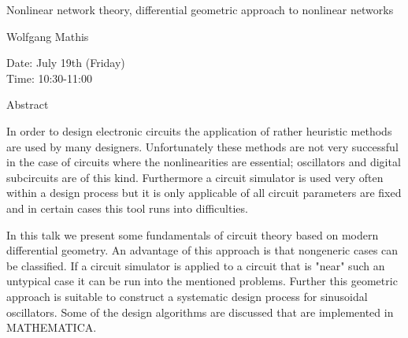 \begin{center}
\LARGE
Nonlinear network theory, differential geometric approach
                     to nonlinear networks
\end{center}

\begin{center}
\Large
Wolfgang Mathis

\end{center}

\noindent
Date:  July 19th (Friday)\\
Time: 10:30-11:00\\

\begin{center}
\large
Abstract
\end{center}

In order to design electronic circuits the application of rather heuristic methods are used by many
designers. Unfortunately these methods are not very successful in the case of circuits where the
nonlinearities are essential; oscillators and digital subcircuits are of this kind. Furthermore a
circuit simulator is used very often within a design process but it is only applicable of all circuit
parameters are fixed and in certain cases this tool runs into difficulties. 

In this talk we present some fundamentals of circuit theory based on modern differential geometry.
An advantage of this approach is that nongeneric cases can be classified. If a circuit simulator is
applied to a circuit that is "near" such an untypical case it can be run into the mentioned problems.
Further this geometric approach is suitable to construct a systematic design process for sinusoidal
oscillators. Some of the design algorithms are discussed that are implemented in
MATHEMATICA. 

